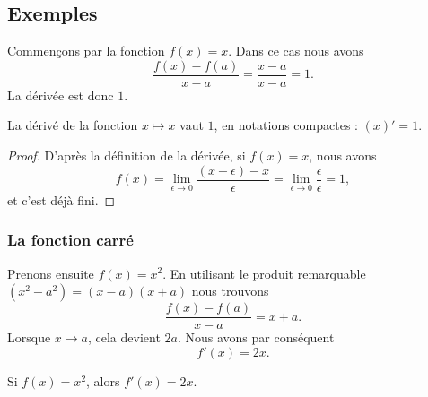 \subsection{Exemples}

\begin{example}
	Commençons par la fonction \( f(x)=x\). Dans ce cas nous avons
	\begin{equation}
		\frac{ f(x)-f(a) }{ x-a }=\frac{ x-a }{ x-a }=1.
	\end{equation}
	La dérivée est donc \( 1\).
\end{example}

\begin{proposition}
	La dérivé de la fonction \( x\mapsto x\) vaut \( 1\), en notations compactes : \( (x)'=1\).
\end{proposition}

\begin{proof}
	D'après la définition de la dérivée, si \( f(x)=x\), nous avons
	\begin{equation}
		f(x)=\lim_{\epsilon\to 0}\frac{ (x+\epsilon) -x }{\epsilon} =\lim_{\epsilon\to 0}\frac{ \epsilon }{\epsilon} =1,
	\end{equation}
	et c'est déjà fini.
\end{proof}

\subsubsection{La fonction carré}

Prenons ensuite \( f(x)=x^2\). En utilisant le produit remarquable \( (x^2-a^2)=(x-a)(x+a)\) nous trouvons
\begin{equation}
	\frac{ f(x)-f(a) }{ x-a }=x+a.
\end{equation}
Lorsque \( x\to a\), cela devient \( 2a\). Nous avons par conséquent
\begin{equation}
	f'(x)=2x.
\end{equation}

\begin{lemma}           \label{LemDeccCarr}
	Si \( f(x)=x^2\), alors \( f'(x)=2x\).
\end{lemma}


